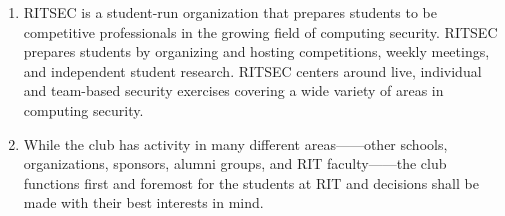 

\begin{enumerate}
	\item RITSEC is a student-run organization that prepares students to be competitive
	      professionals in the growing field of computing security. RITSEC prepares
	      students by organizing and hosting competitions, weekly meetings, and
	      independent student research. RITSEC centers around live, individual and
	      team-based security exercises covering a wide variety of areas in computing
	      security.
	\item While the club has activity in many different areas——other schools,
	      organizations, sponsors, alumni groups, and RIT faculty——the club functions
	      first and foremost for the students at RIT and decisions shall be made with
	      their best interests in mind.
\end{enumerate}